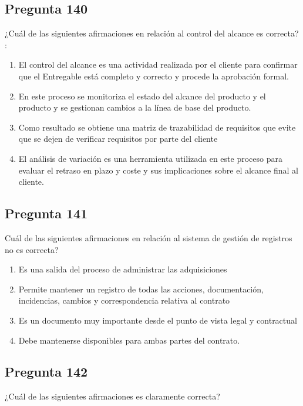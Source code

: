 \documentclass[11pt,a4paper]{article}
\begin{document}
\subsection*{Pregunta 140}
¿Cuál de las siguientes afirmaciones en relación al control del alcance es correcta? :

\begin{enumerate}[label=\alph*)]
  \item El control del alcance es una actividad realizada por el cliente para confirmar que el Entregable está completo y correcto y procede la aprobación formal.
  \item En este proceso se monitoriza el estado del alcance del producto y el producto y se gestionan cambios a la línea de base del producto.
  \item Como resultado se obtiene una matriz de trazabilidad de requisitos que evite que se dejen de verificar requisitos por parte del cliente
  \item El análisis de variación es una herramienta utilizada en este proceso para evaluar el retraso en plazo y coste y sus implicaciones sobre el alcance final al cliente.
\end{enumerate}

\subsection*{Pregunta 141}
Cuál de las siguientes afirmaciones en relación al sistema de gestión de registros no es correcta?

\begin{enumerate}[label=\alph*)]
  \item Es una salida del proceso de administrar las adquisiciones
  \item Permite mantener un registro de todas las acciones, documentación, incidencias, cambios y correspondencia relativa al contrato
  \item Es un documento muy importante desde el punto de vista legal y contractual
  \item Debe mantenerse disponibles para ambas partes del contrato.
\end{enumerate}

\subsection*{Pregunta 142}
¿Cuál de las siguientes afirmaciones es claramente correcta?
\end{document}
